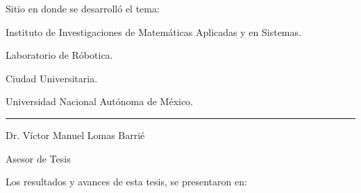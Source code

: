 \documentclass[12pt]{book} %
\begin{document}




\vspace{2cm}
Sitio en donde se desarrolló el tema:

Instituto de Investigaciones de Matemáticas Aplicadas y en Sistemas.

Laboratorio de Róbotica.

Ciudad Universitaria.

Universidad Nacional Autónoma de México.

\vspace{2cm}

\rule{7.5cm}{0.3mm} 

Dr. Víctor Manuel Lomas Barrié

Asesor de Tesis 



\newpage
\vspace{6cm}

Los resultados y avances de esta tesis, se presentaron en:

	
	

\newpage
\end{document}
